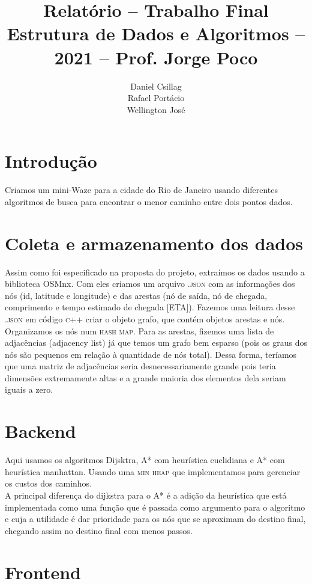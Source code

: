 \documentclass{article}
\title{Relatório -- Trabalho Final \\
       \large Estrutura de Dados e Algoritmos -- 2021 -- Prof. Jorge Poco}
\author{Daniel Csillag \\ Rafael Portácio \\ Wellington José}
\begin{document}
\maketitle

\section{Introdução}
Criamos um mini-Waze para a cidade do Rio de Janeiro usando diferentes algoritmos de busca para encontrar o menor caminho entre dois pontos dados. 

\section{Coleta e armazenamento dos dados}

Assim como foi especificado na proposta do projeto, extraímos os dados usando a biblioteca OSMnx. Com eles criamos um arquivo \textsc{.json} com as informações dos nós (id, latitude e longitude) e das arestas (nó de saída, nó de chegada, comprimento e tempo estimado de chegada [ETA]). Fazemos uma leitura desse \textsc{.json} em código \textsc{c++} criar o objeto grafo, que contém objetos arestas e nós. Organizamos os nós num \textsc{hash map}. Para as arestas, fizemos uma lista de adjacências (adjacency list) já que temos um grafo bem esparso (pois os graus dos nós são pequenos em relação à quantidade de nós total). Dessa forma, teríamos que uma matriz de adjacências seria desnecessariamente grande pois teria dimensões extremamente altas e a grande maioria dos elementos dela seriam iguais a zero.

\section{Backend}

Aqui usamos os algoritmos Dijsktra, A* com heurística euclidiana e A* com heurística manhattan. Usando uma \textsc{min heap} que implementamos para gerenciar os custos dos caminhos. \\

A principal diferença do dijkstra para o A* é a adição da heurística que está implementada como uma função que é passada como argumento para o algoritmo e cuja a utilidade é dar prioridade para os nós que se aproximam do destino final, chegando assim no destino final com menos passos.

\section{Frontend}
\end{document}
